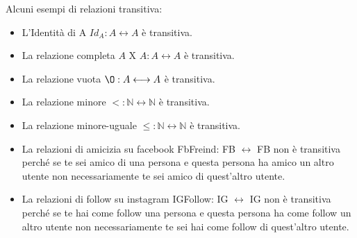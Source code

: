 \begin{example}
Alcuni esempi di relazioni transitiva:
    \begin{itemize}
        \item L'Identità di A $Id_A: A \longleftrightarrow A$ è transitiva.
        \item La relazione completa $A$ X $A:A \longleftrightarrow A$ è transitiva.
        \item La relazione vuota $\O: A \longleftrightarrow A$ è transitiva.
        \item La relazione minore $<: \mathbb{N} \longleftrightarrow \mathbb{N}$ è transitiva.
        \item La relazione minore-uguale $\leq: \mathbb{N} \longleftrightarrow \mathbb{N}$ è transitiva.
        \item La relazioni di amicizia su facebook FbFreind: FB $\longleftrightarrow$ FB non è transitiva perché se te sei amico di una persona e questa persona ha amico un altro utente non necessariamente te sei amico di quest'altro utente.
        \item La relazioni di follow su instagram IGFollow: IG $\longleftrightarrow$ IG non è transitiva perché se te hai come follow una persona e questa persona ha come follow un altro utente non necessariamente te sei hai come follow di quest'altro utente.
    \end{itemize}
\end{example}

